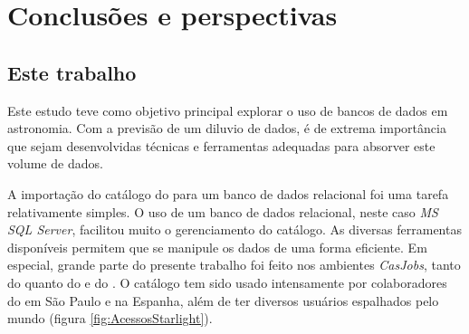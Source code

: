 


\chapter{Conclusões e perspectivas}
\label{sec:conclusao}



\section{Este trabalho}

Este estudo teve como objetivo principal explorar o uso de bancos de dados em
astronomia. Com a previsão de um diluvio de dados, é de extrema importância que
sejam desenvolvidas técnicas e ferramentas adequadas para absorver este volume
de dados.

A importação do catálogo do \starlight para um banco de dados relacional foi uma
tarefa relativamente simples. O uso de um banco de dados relacional, neste caso
{\em MS SQL Server}, facilitou muito o gerenciamento do catálogo. As diversas
ferramentas disponíveis permitem que se manipule os dados de uma forma
eficiente. Em especial, grande parte do presente trabalho foi feito nos
ambientes {\em CasJobs}, tanto do \starlight quanto do \SDSS e do \galex. O
catálogo tem sido usado intensamente por colaboradores do \starlight em São
Paulo e na Espanha, além de ter diversos usuários espalhados pelo mundo (figura
\ref{fig:AcessosStarlight}).\fixme

